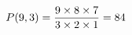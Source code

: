 \documentclass[preview]{standalone}
\begin{document}
\begin{align*}
\special{dvisvgm:raw <g id='unique000'>}P(9,3) = \frac{9 \times 8 \times 7}{3 \times 2 \times 1} = 84\special{dvisvgm:raw </g>}
\end{align*}
\end{document}
